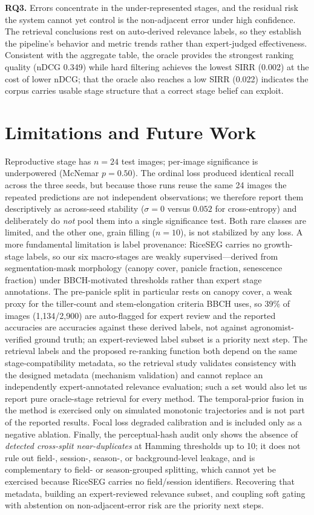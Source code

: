 \documentclass[conference]{IEEEtran}
\begin{document}
\textbf{RQ3.} Errors concentrate in the under-represented stages, and the residual risk the system cannot yet control is the non-adjacent error under high confidence. The retrieval conclusions rest on auto-derived relevance labels, so they establish the pipeline's behavior and metric trends rather than expert-judged effectiveness. Consistent with the aggregate table, the oracle provides the strongest ranking quality (nDCG 0.349) while hard filtering achieves the lowest SIRR (0.002) at the cost of lower nDCG; that the oracle also reaches a low SIRR (0.022) indicates the corpus carries usable stage structure that a correct stage belief can exploit.

\section{Limitations and Future Work}
\label{sec:limitations}

Reproductive stage has $n=24$ test images; per-image significance is underpowered (McNemar $p=0.50$). The ordinal loss produced identical recall across the three seeds, but because those runs reuse the same 24 images the repeated predictions are not independent observations; we therefore report them descriptively as across-seed stability ($\sigma=0$ versus $0.052$ for cross-entropy) and deliberately do \emph{not} pool them into a single significance test. Both rare classes are limited, and the other one, grain filling ($n=10$), is not stabilized by any loss. A more fundamental limitation is label provenance: RiceSEG carries no growth-stage labels, so our six macro-stages are weakly supervised---derived from segmentation-mask morphology (canopy cover, panicle fraction, senescence fraction) under BBCH-motivated thresholds rather than expert stage annotations. The pre-panicle split in particular rests on canopy cover, a weak proxy for the tiller-count and stem-elongation criteria BBCH uses, so 39\% of images (1{,}134/2{,}900) are auto-flagged for expert review and the reported accuracies are accuracies against these derived labels, not against agronomist-verified ground truth; an expert-reviewed label subset is a priority next step. The retrieval labels and the proposed re-ranking function both depend on the same stage-compatibility metadata, so the retrieval study validates consistency with the designed metadata (mechanism validation) and cannot replace an independently expert-annotated relevance evaluation; such a set would also let us report pure oracle-stage retrieval for every method. The temporal-prior fusion in the method is exercised only on simulated monotonic trajectories and is not part of the reported results. Focal loss degraded calibration and is included only as a negative ablation. Finally, the perceptual-hash audit only shows the absence of \emph{detected cross-split near-duplicates} at Hamming thresholds up to 10; it does not rule out field-, session-, season-, or background-level leakage, and is complementary to field- or season-grouped splitting, which cannot yet be exercised because RiceSEG carries no field/session identifiers. Recovering that metadata, building an expert-reviewed relevance subset, and coupling soft gating with abstention on non-adjacent-error risk are the priority next steps.
\end{document}
